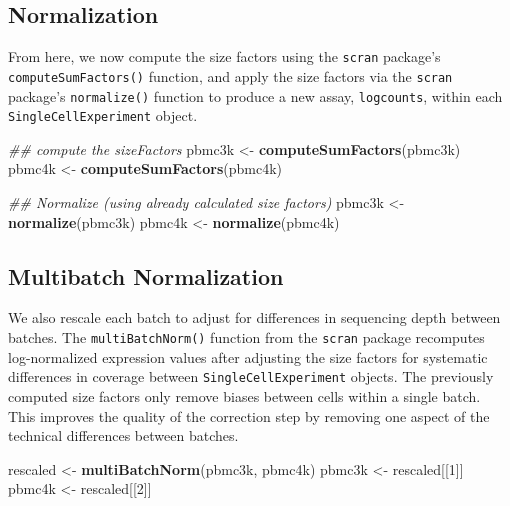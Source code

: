 \documentclass[]{book}
\newenvironment{Shaded}{\begin{snugshade}}{\end{snugshade}}
\newcommand{\CommentTok}[1]{\textcolor[rgb]{0.56,0.35,0.01}{\textit{#1}}}
\newcommand{\DecValTok}[1]{\textcolor[rgb]{0.00,0.00,0.81}{#1}}
\newcommand{\KeywordTok}[1]{\textcolor[rgb]{0.13,0.29,0.53}{\textbf{#1}}}
\newcommand{\NormalTok}[1]{#1}
\newcommand{\StringTok}[1]{\textcolor[rgb]{0.31,0.60,0.02}{#1}}
\begin{document}
\hypertarget{normalization}{%
\subsection{Normalization}\label{normalization}}

From here, we now compute the size factors using the \texttt{scran} package's \texttt{computeSumFactors()} function, and apply the size factors via the \texttt{scran} package's \texttt{normalize()} function to produce a new assay, \texttt{logcounts}, within each \texttt{SingleCellExperiment} object.

\begin{Shaded}
\begin{Highlighting}[]
\CommentTok{## compute the sizeFactors}
\NormalTok{pbmc3k <-}\StringTok{ }\KeywordTok{computeSumFactors}\NormalTok{(pbmc3k)}
\NormalTok{pbmc4k <-}\StringTok{ }\KeywordTok{computeSumFactors}\NormalTok{(pbmc4k)}

\CommentTok{## Normalize (using already calculated size factors)}
\NormalTok{pbmc3k <-}\StringTok{ }\KeywordTok{normalize}\NormalTok{(pbmc3k)}
\NormalTok{pbmc4k <-}\StringTok{ }\KeywordTok{normalize}\NormalTok{(pbmc4k)}
\end{Highlighting}
\end{Shaded}

\hypertarget{multibatch-normalization}{%
\subsection{Multibatch Normalization}\label{multibatch-normalization}}

We also rescale each batch to adjust for differences in sequencing depth between batches. The \texttt{multiBatchNorm()} function from the \texttt{scran} package recomputes log-normalized expression values after adjusting the size factors for systematic differences in coverage between \texttt{SingleCellExperiment} objects. The previously computed size factors only remove biases between cells within a single batch. This improves the quality of the correction step by removing one aspect of the technical differences between batches.

\begin{Shaded}
\begin{Highlighting}[]
\NormalTok{rescaled <-}\StringTok{ }\KeywordTok{multiBatchNorm}\NormalTok{(pbmc3k, pbmc4k)}
\NormalTok{pbmc3k <-}\StringTok{ }\NormalTok{rescaled[[}\DecValTok{1}\NormalTok{]]}
\NormalTok{pbmc4k <-}\StringTok{ }\NormalTok{rescaled[[}\DecValTok{2}\NormalTok{]]}
\end{Highlighting}
\end{Shaded}
\end{document}
